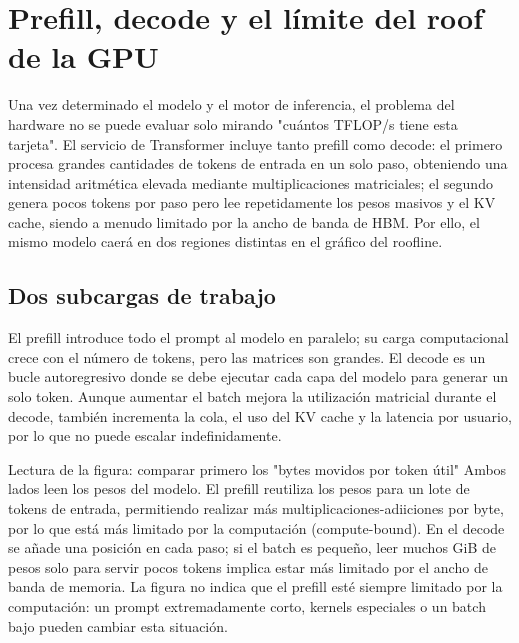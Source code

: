 \section{Prefill, decode y el límite del roof de la GPU}

Una vez determinado el modelo y el motor de inferencia, el problema del hardware no se puede evaluar solo mirando "cuántos TFLOP/s tiene esta tarjeta". El servicio de Transformer incluye tanto prefill como decode: el primero procesa grandes cantidades de tokens de entrada en un solo paso, obteniendo una intensidad aritmética elevada mediante multiplicaciones matriciales; el segundo genera pocos tokens por paso pero lee repetidamente los pesos masivos y el KV cache, siendo a menudo limitado por la ancho de banda de HBM. Por ello, el mismo modelo caerá en dos regiones distintas en el gráfico del roofline.

\subsection{Dos subcargas de trabajo}

El prefill introduce todo el prompt al modelo en paralelo; su carga computacional crece con el número de tokens, pero las matrices son grandes. El decode es un bucle autoregresivo donde se debe ejecutar cada capa del modelo para generar un solo token. Aunque aumentar el batch mejora la utilización matricial durante el decode, también incrementa la cola, el uso del KV cache y la latencia por usuario, por lo que no puede escalar indefinidamente.


\begin{knowledgebox}{Lectura de la figura: comparar primero los "bytes movidos por token útil"}
Ambos lados leen los pesos del modelo. El prefill reutiliza los pesos para un lote de tokens de entrada, permitiendo realizar más multiplicaciones-adiiciones por byte, por lo que está más limitado por la computación (compute-bound). En el decode se añade una posición en cada paso; si el batch es pequeño, leer muchos GiB de pesos solo para servir pocos tokens implica estar más limitado por el ancho de banda de memoria. La figura no indica que el prefill esté siempre limitado por la computación: un prompt extremadamente corto, kernels especiales o un batch bajo pueden cambiar esta situación.
\end{knowledgebox}

